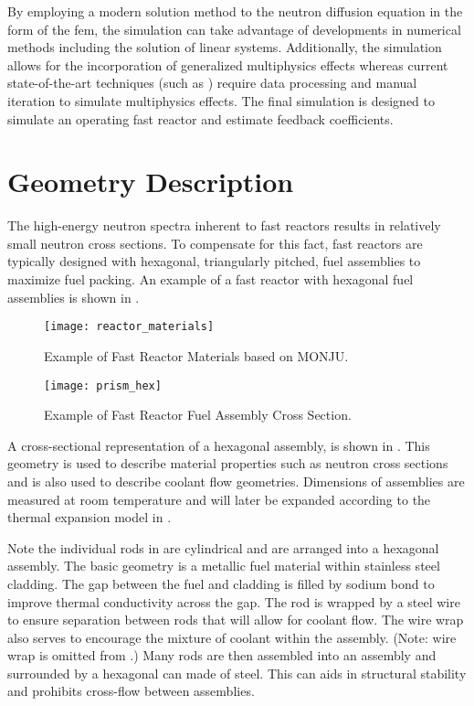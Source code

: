   By employing a modern solution method to the neutron diffusion equation in the
  form of the \gls{fem}, the simulation can take advantage of developments in
  numerical methods including the solution of linear systems.  Additionally, the
  simulation allows for the incorporation of generalized multiphysics effects
  whereas current state-of-the-art techniques (such as \dif) require data
  processing and manual iteration to simulate multiphysics effects. The final
  simulation is designed to simulate an operating fast reactor and estimate
  feedback coefficients.

\section{Geometry Description}
  \label{sec:geometry_description}
  The high-energy neutron spectra inherent to fast reactors results in
  relatively small neutron cross sections.  To compensate for this fact, fast
  reactors are typically designed with hexagonal, triangularly pitched, fuel
  assemblies to maximize fuel packing.  An example of a fast reactor with
  hexagonal fuel assemblies is shown in .
  
  \begin{figure}
    \centering
    \texttt{[image: reactor\_materials]}
    \caption{Example of Fast Reactor Materials based on MONJU.}
    \label{fig:reactor_materials}
  \end{figure}

  \begin{figure}
    \centering
    \texttt{[image: prism\_hex]}
    \caption{Example of Fast Reactor Fuel Assembly Cross Section.}
    \label{fig:prism_hex}
  \end{figure}

  A cross-sectional representation of a hexagonal assembly, is shown in
  .  This geometry is used to describe material properties
  such as neutron cross sections and is also used to describe coolant flow
  geometries.  Dimensions of assemblies are measured at room temperature and
  will later be expanded according to the thermal expansion model in
  .

  Note the individual rods in  are cylindrical and are
  arranged into a hexagonal assembly. The basic geometry is a metallic fuel
  material within stainless steel cladding. The gap between the fuel and
  cladding is filled by sodium bond to improve thermal conductivity across the
  gap. The rod is wrapped by a steel wire to ensure separation between rods that
  will allow for coolant flow. The wire wrap also serves to encourage the
  mixture of coolant within the assembly. (Note: wire wrap is omitted from
  .) Many rods are then assembled into an assembly and
  surrounded by a hexagonal can made of steel. This can aids in structural
  stability and prohibits cross-flow between assemblies. 

